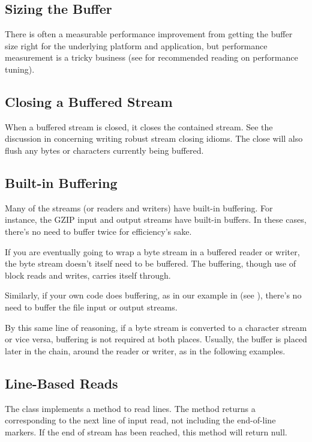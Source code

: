 \subsection{Sizing the Buffer}

There is often a measurable performance improvement from getting the
buffer size right for the underlying platform and application, but
performance measurement is a tricky business (see
 for recommended reading on performance tuning).

\subsection{Closing a Buffered Stream}

When a buffered stream is closed, it closes the contained stream.  See
the discussion in  concerning writing
robust stream closing idioms.  The close will also flush any bytes
or characters currently being buffered.

\subsection{Built-in Buffering}

Many of the streams (or readers and writers) have built-in buffering.
For instance, the GZIP input and output streams have built-in buffers.
In these cases, there's no need to buffer twice for efficiency's sake.

If you are eventually going to wrap a byte stream in a buffered
reader or writer, the byte stream doesn't itself need to be buffered.
The buffering, though use of block reads and writes, carries itself through.

Similarly, if your own code does buffering, as in our example in
 (see ), there's no need to buffer
the file input or output streams.

By this same line of reasoning, if a byte stream is converted to a
character stream or vice versa, buffering is not required at both
places.  Usually, the buffer is placed later in the chain, around the
reader or writer, as in the following examples.
%
%

\subsection{Line-Based Reads}

The  class implements a method to read lines.
The method  returns a  corresponding to
the next line of input read, not including the end-of-line markers.
If the end of stream has been reached, this method will return null.

